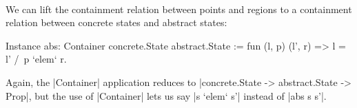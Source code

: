 \documentclass[runningheads]{llncs}
\begin{document}
\

We can lift the containment relation between points and regions to a containment relation between concrete states and abstract states:
\begin{code}
  Instance abs: Container concrete.State abstract.State
    := fun (l, p) (l', r) => l = l' /\ p `elem` r.
\end{code}
Again, the |Container| application reduces to |concrete.State -> abstract.State -> Prop|, but the use of |Container| lets us say |s `elem` s'| instead of |abs s s'|. 







\end{document}
